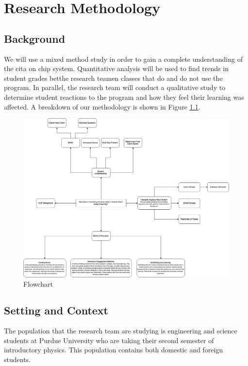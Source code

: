 \chapter[Research Methodology]{Research Methodology}

\section{Background}

We will use a mixed method study in order to gain a complete understanding of the \gls{cita} on \gls{chip} system. Quantitative analysis will be used to find trends in student grades betthe research teamen classes that do and do not use the program. In parallel, the research team will conduct a qualitative study to determine student reactions to the program and how they feel their learning was affected. A breakdown of our methodology is shown in Figure \ref{fig:flowchart}.

\begin{figure}[!htb]
	\centering
	\includegraphics[width=6in]{img/chapter3/flowchart}
	\caption[Flowchart]{Flowchart}
  \label{fig:flowchart}
\end{figure}

\section{Setting and Context}

The population that the research team are studying is engineering and science students at Purdue University who are taking their second semester of introductory physics. This population contains both domestic and foreign students.

